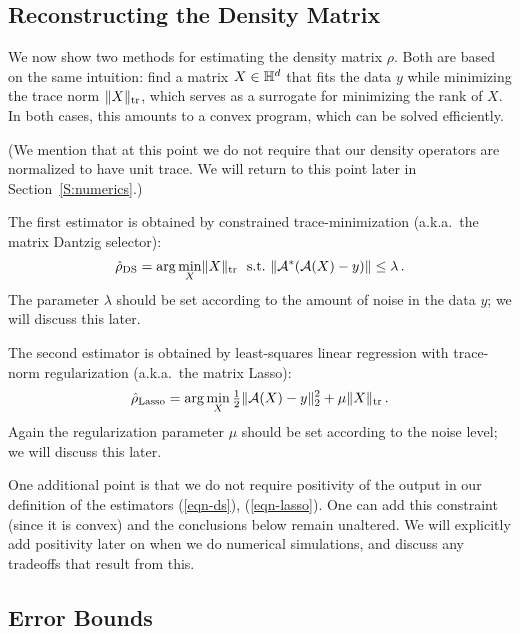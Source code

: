 \subsection{Reconstructing the Density Matrix}


We now show two methods for estimating the density matrix $\rho$.  Both are based on the same intuition:  find a matrix $X \in \mathbb{H}^d$ that fits the data $y$ while minimizing the trace norm $\lVert X\rVert_{\mathrm{tr}}$, which serves as a surrogate for minimizing the rank of $X$. In both cases, this amounts to a convex program, which can be solved efficiently.

(We mention that at this point we do not require that our density operators are normalized to have unit trace. We will return to this point later in Section~\ref{S:numerics}.)

The first estimator is obtained by constrained trace-minimization (a.k.a.\ the matrix Dantzig selector):
\begin{equation}\label{eqn-ds}
	\hat{\rho}_{\mathrm{DS}} = \arg\min_X \lVert X\rVert_{\mathrm{tr}} \ \ \mbox{s.t.} \  \lVert\mathcal{A}^*(\mathcal{A}(X)-y)\rVert \leq \lambda\,.
\end{equation}
The parameter $\lambda$ should be set according to the amount of noise in the data $y$; we will discuss this later.

The second estimator is obtained by least-squares linear regression with trace-norm regularization (a.k.a.\ the matrix Lasso):
\begin{equation}\label{eqn-lasso}
	\hat{\rho}_{\mathrm{Lasso}} = \arg\min_X \tfrac{1}{2} \lVert\mathcal{A}(X)-y\rVert_2^2 + \mu \lVert X\rVert_{\mathrm{tr}}\,.
\end{equation}
Again the regularization parameter $\mu$ should be set according to the noise level; we will discuss this later.

One additional point is that we do not require positivity of the output in our definition of the estimators (\ref{eqn-ds}), (\ref{eqn-lasso}). One can add this constraint (since it is convex) and the conclusions below remain unaltered. We will explicitly add positivity later on when we do numerical simulations, and discuss any tradeoffs that result from this.


\subsection{Error Bounds}


